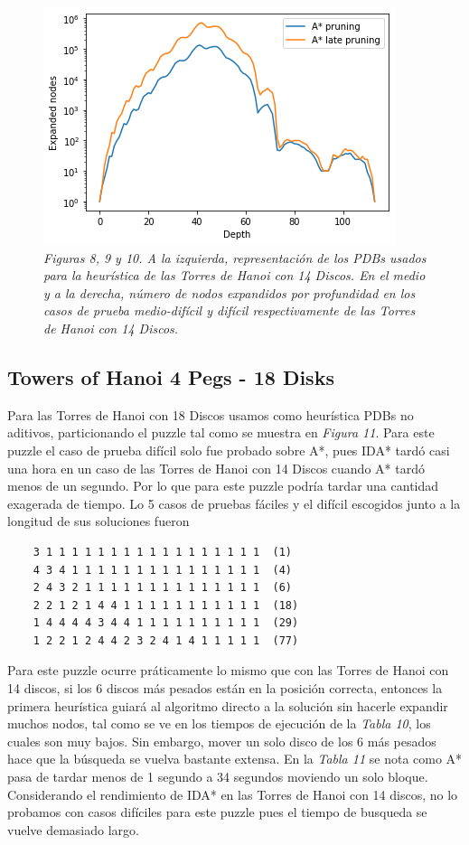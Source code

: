 \documentclass[a4paper,10pt]{article}
\begin{document}
\begin{figure}[t!]
      \includegraphics[scale=0.4]{hanois14D/hanois14_hard.png} \\
      \textit{\small{Figuras 8, 9 y 10. A la izquierda, representaci\'on de los PDBs
      usados para la heur\'istica de las Torres de Hanoi con 14 Discos. En el medio y a la derecha, n\'umero de nodos expandidos por profundidad en los casos de prueba
      medio-dif\'icil y dif\'icil respectivamente de las Torres de Hanoi con 14 Discos.}}
    \end{figure}

  \subsection{Towers of Hanoi 4 Pegs - 18 Disks}
    Para las Torres de Hanoi con 18 Discos usamos como heur\'istica PDBs no aditivos, 
    particionando el puzzle tal como se muestra en \textit{Figura 11}. Para este puzzle
    el caso de prueba dif\'icil solo fue probado sobre A*, pues IDA* tard\'o casi una 
    hora en un caso de las Torres de Hanoi con 14 Discos cuando A* tard\'o menos de 
    un segundo. Por lo que para este puzzle podr\'ia tardar una cantidad exagerada de
    tiempo. Lo 5 casos de pruebas f\'aciles y el dif\'icil escogidos junto a la 
    longitud de sus soluciones fueron
    
    \begin{verbatim}
    3 1 1 1 1 1 1 1 1 1 1 1 1 1 1 1 1 1  (1)
    4 3 4 1 1 1 1 1 1 1 1 1 1 1 1 1 1 1  (4)
    2 4 3 2 1 1 1 1 1 1 1 1 1 1 1 1 1 1  (6)
    2 2 1 2 1 4 4 1 1 1 1 1 1 1 1 1 1 1  (18)    
    1 4 4 4 4 3 4 4 1 1 1 1 1 1 1 1 1 1  (29)
    1 2 2 1 2 4 4 2 3 2 4 1 4 1 1 1 1 1  (77)
    \end{verbatim}
    
    Para este puzzle ocurre pr\'aticamente lo mismo que con las Torres de Hanoi con
    14 discos, si los 6 discos m\'as pesados est\'an en la posici\'on correcta, entonces
    la primera heur\'istica guiar\'a al algoritmo directo a la soluci\'on sin hacerle
    expandir muchos nodos, tal como se ve en los tiempos de ejecuci\'on de la 
    \textit{Tabla 10}, los cuales son muy bajos. Sin embargo, mover un solo disco de
    los 6 m\'as pesados hace que la b\'usqueda se vuelva bastante extensa. En la 
    \textit{Tabla 11} se nota como A* pasa de tardar menos de 1 segundo a 34 segundos
    moviendo un solo bloque. Considerando el rendimiento de IDA* en las Torres de Hanoi 
    con 14 discos, no lo probamos con casos dif\'iciles para este puzzle pues el tiempo
    de busqueda se vuelve demasiado largo. \\
    
\end{document}
